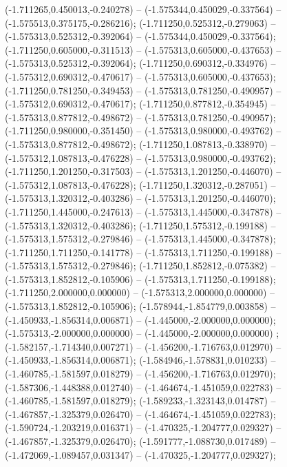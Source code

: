  (-1.711265,0.450013,-0.240278) -- (-1.575344,0.450029,-0.337564) -- (-1.575513,0.375175,-0.286216);
 (-1.711250,0.525312,-0.279063) -- (-1.575313,0.525312,-0.392064) -- (-1.575344,0.450029,-0.337564);
 (-1.711250,0.605000,-0.311513) -- (-1.575313,0.605000,-0.437653) -- (-1.575313,0.525312,-0.392064);
 (-1.711250,0.690312,-0.334976) -- (-1.575312,0.690312,-0.470617) -- (-1.575313,0.605000,-0.437653);
 (-1.711250,0.781250,-0.349453) -- (-1.575313,0.781250,-0.490957) -- (-1.575312,0.690312,-0.470617);
 (-1.711250,0.877812,-0.354945) -- (-1.575313,0.877812,-0.498672) -- (-1.575313,0.781250,-0.490957);
 (-1.711250,0.980000,-0.351450) -- (-1.575313,0.980000,-0.493762) -- (-1.575313,0.877812,-0.498672);
 (-1.711250,1.087813,-0.338970) -- (-1.575312,1.087813,-0.476228) -- (-1.575313,0.980000,-0.493762);
 (-1.711250,1.201250,-0.317503) -- (-1.575313,1.201250,-0.446070) -- (-1.575312,1.087813,-0.476228);
 (-1.711250,1.320312,-0.287051) -- (-1.575313,1.320312,-0.403286) -- (-1.575313,1.201250,-0.446070);
 (-1.711250,1.445000,-0.247613) -- (-1.575313,1.445000,-0.347878) -- (-1.575313,1.320312,-0.403286);
 (-1.711250,1.575312,-0.199188) -- (-1.575313,1.575312,-0.279846) -- (-1.575313,1.445000,-0.347878);
 (-1.711250,1.711250,-0.141778) -- (-1.575313,1.711250,-0.199188) -- (-1.575313,1.575312,-0.279846);
 (-1.711250,1.852812,-0.075382) -- (-1.575313,1.852812,-0.105906) -- (-1.575313,1.711250,-0.199188);
 (-1.711250,2.000000,0.000000) -- (-1.575313,2.000000,0.000000) -- (-1.575313,1.852812,-0.105906);
 (-1.578944,-1.854779,0.003858) -- (-1.450933,-1.856314,0.006871) -- (-1.445000,-2.000000,0.000000);
 (-1.575313,-2.000000,0.000000) -- (-1.445000,-2.000000,0.000000) ;
 (-1.582157,-1.714340,0.007271) -- (-1.456200,-1.716763,0.012970) -- (-1.450933,-1.856314,0.006871);
 (-1.584946,-1.578831,0.010233) -- (-1.460785,-1.581597,0.018279) -- (-1.456200,-1.716763,0.012970);
 (-1.587306,-1.448388,0.012740) -- (-1.464674,-1.451059,0.022783) -- (-1.460785,-1.581597,0.018279);
 (-1.589233,-1.323143,0.014787) -- (-1.467857,-1.325379,0.026470) -- (-1.464674,-1.451059,0.022783);
 (-1.590724,-1.203219,0.016371) -- (-1.470325,-1.204777,0.029327) -- (-1.467857,-1.325379,0.026470);
 (-1.591777,-1.088730,0.017489) -- (-1.472069,-1.089457,0.031347) -- (-1.470325,-1.204777,0.029327);
